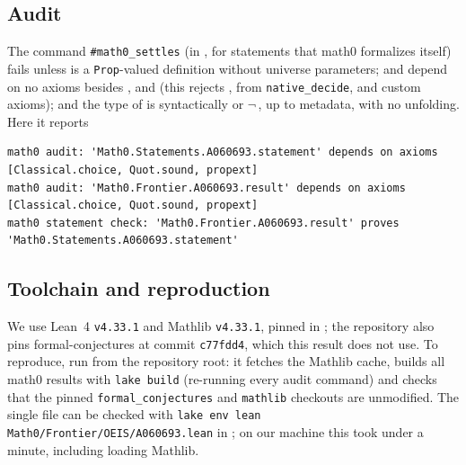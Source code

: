 \documentclass[11pt]{amsart}
\theoremstyle{plain}
\theoremstyle{definition}
\begin{document}
\subsection*{Audit}
The command \texttt{\#math0\_settles} (in , for statements that math0 formalizes itself) fails unless  is a \texttt{Prop}-valued definition without universe parameters;  and  depend on no axioms besides ,  and  (this rejects ,  from \texttt{native\_decide}, and custom axioms); and the type of  is syntactically  or $\neg$\,, up to metadata, with no unfolding. Here it reports
\begin{lstlisting}[basicstyle=\ttfamily\scriptsize]
math0 audit: 'Math0.Statements.A060693.statement' depends on axioms [Classical.choice, Quot.sound, propext]
math0 audit: 'Math0.Frontier.A060693.result' depends on axioms [Classical.choice, Quot.sound, propext]
math0 statement check: 'Math0.Frontier.A060693.result' proves 'Math0.Statements.A060693.statement'
\end{lstlisting}

\subsection*{Toolchain and reproduction}
We use Lean~4 \cite{Lean4} \texttt{v4.33.1} and Mathlib \cite{Mathlib} \texttt{v4.33.1}, pinned in ; the repository also pins formal-conjectures \cite{FC} at commit \texttt{c77fdd4}, which this result does not use. To reproduce, run  from the repository root: it fetches the Mathlib cache, builds all math0 results with \texttt{lake build} (re-running every audit command) and checks that the pinned \texttt{formal\_conjectures} and \texttt{mathlib} checkouts are unmodified. The single file can be checked with \texttt{lake env lean Math0/Frontier/OEIS/A060693.lean} in ; on our machine this took under a minute, including loading Mathlib.
\end{document}
